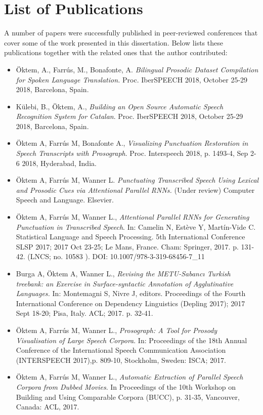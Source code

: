 \section{List of Publications}
\label{conclusions:publications}
A number of papers were successfully published in peer-reviewed conferences that cover some of the work presented in this dissertation. Below lists these publications together with the related ones that the author contributed:

\begin{itemize}
\item Öktem, A., Farrús, M., Bonafonte, A. \textit{Bilingual Prosodic Dataset Compilation for Spoken Language Translation.} Proc. IberSPEECH 2018, October 25-29 2018, Barcelona, Spain.

\item Külebi, B., Öktem, A., \textit{Building an Open Source Automatic Speech Recognition System for Catalan}. Proc. IberSPEECH 2018, October 25-29 2018, Barcelona, Spain.

\item Öktem A, Farrús M, Bonafonte A., \textit{Visualizing Punctuation Restoration in Speech Transcripts with Prosograph}. Proc. Interspeech 2018, p. 1493-4, Sep 2-6 2018, Hyderabad, India.

\item Öktem A, Farrús M, Wanner L. \textit{Punctuating Transcribed Speech Using Lexical and Prosodic Cues via Attentional Parallel RNNs.} (Under review) Computer Speech and Language. Elsevier.

\item Öktem A, Farrús M, Wanner L., \textit{Attentional Parallel RNNs for Generating Punctuation in Transcribed Speech}. In: Camelin N, Estève Y, Martín-Vide C. Statistical Language and Speech Processing. 5th International Conference SLSP 2017; 2017 Oct 23-25; Le Mans, France. Cham: Springer, 2017. p. 131-42. (LNCS; no. 10583 ). DOI: 10.1007/978-3-319-68456-7\_11

\item Burga A, Öktem A, Wanner L., \textit{Revising the METU-Sabancı Turkish treebank: an Exercise in Surface-syntactic Annotation of Agglutinative Languages.} In: Montemagni S, Nivre J, editors. Proceedings of the Fourth International Conference on Dependency Linguistics (Depling 2017); 2017 Sept 18-20; Pisa, Italy. ACL; 2017. p. 32-41.

\item Öktem A, Farrús M, Wanner L., \textit{Prosograph: A Tool for Prosody Visualisation of Large Speech Corpora}. In: Proceedings of the 18th Annual Conference of the International Speech Communication Association (INTERSPEECH 2017),p. 809-10, Stockholm, Sweden: ISCA; 2017. 

\item Öktem A, Farrús M, Wanner L., \textit{Automatic Extraction of Parallel Speech Corpora from Dubbed Movies}. In Proceedings of the 10th Workshop on Building and Using Comparable Corpora (BUCC), p. 31-35, Vancouver, Canada: ACL, 2017. 

\end{itemize}

